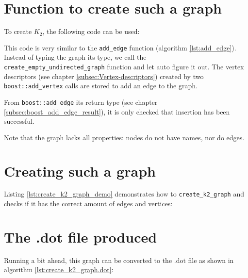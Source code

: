 \section{Function to create such a graph}

To create $K_{2}$, the following code can be used:



This code is very similar to 
the \verb;add_edge; function (algorithm \ref{lst:add_edge}).
Instead of typing the graph its type, 
we call the \verb;create_empty_undirected_graph; 
function and let auto figure it out.
The vertex descriptors 
(see chapter \ref{subsec:Vertex-descriptors}) 
created by two \verb;boost::add_vertex; 
calls are stored to add an edge to the graph.

From \verb;boost::add_edge; 
its return type 
(see chapter \ref{subsec:boost_add_edge_result}), 
it is only checked that insertion has been successful.

Note that the graph lacks all properties: nodes do not have names, nor do
edges.

\section{Creating such a graph}

Listing \ref{lst:create_k2_graph_demo}
demonstrates how to \verb;create_k2_graph; and checks if it has the correct
amount of edges and vertices:



\section{The .dot file produced}
\label{subsec:create_k2_dot}

Running a bit ahead, this graph can be converted to the .dot file as shown
in algorithm \ref{lst:create_k2_graph.dot}:



